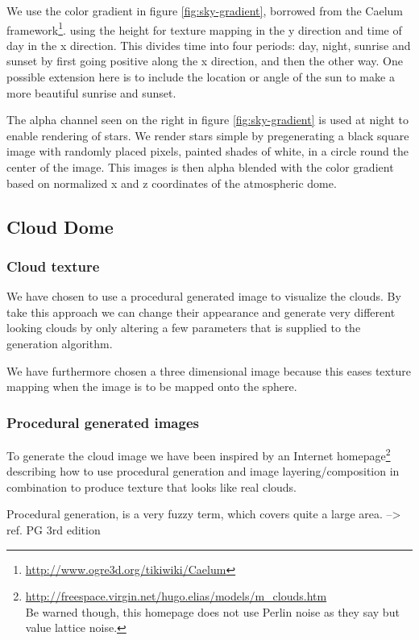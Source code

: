We use the color gradient in figure
\ref{fig:sky-gradient}, borrowed from the Caelum
framework\footnote{\url{http://www.ogre3d.org/tikiwiki/Caelum}}.
using the height for texture mapping in the y direction and time of
day in the x direction. This divides time into four periods: day,
night, sunrise and sunset by first going positive along the x direction,
and then the other way.
One possible extension here is to include the location or angle of the
sun to make a more beautiful sunrise and sunset.

The alpha channel seen on the right in figure \ref{fig:sky-gradient}
is used at night to enable rendering of stars. We render stars simple
by pregenerating a black square image with randomly placed pixels,
painted shades of white, in a circle round the center of the
image. This images is then alpha blended with the color gradient based
on normalized x and z coordinates of the atmospheric dome.

\subsection{Cloud Dome}

\subsubsection{Cloud texture}
We have chosen to use a procedural generated image to visualize the
clouds. By take this approach we can change their appearance and
generate very different looking clouds by only altering a few
parameters that is supplied to the generation algorithm.

We have furthermore chosen a three dimensional image because this
eases texture mapping when the image is to be mapped onto the sphere.

\subsubsection{Procedural generated images}
To generate the cloud image we have been inspired by an Internet
homepage\footnote{\url{http://freespace.virgin.net/hugo.elias/models/m_clouds.htm}
  \\Be warned though, this homepage does not use Perlin noise as they
  say but value lattice noise.}
describing how to use procedural generation and
image layering/composition in combination to produce texture that
looks like real clouds.

Procedural generation, is a very fuzzy term, which covers quite a
large area.
--> ref. PG 3rd edition

